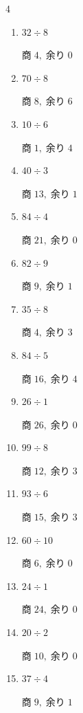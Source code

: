 \begin{multicols}{4}
\begin{enumerate}
\columnbreak %

  \item $32 \div 8$

        $商\; 4,\; 余り\; 0$

  \item $70 \div 8$

        $商\; 8,\; 余り\; 6$

  \item $10 \div 6$

        $商\; 1,\; 余り\; 4$

  \item $40 \div 3$

        $商\; 13,\; 余り\; 1$

  \item $84 \div 4$

        $商\; 21,\; 余り\; 0$

  \item $82 \div 9$

        $商\; 9,\; 余り\; 1$

  \item $35 \div 8$

        $商\; 4,\; 余り\; 3$

  \item $84 \div 5$

        $商\; 16,\; 余り\; 4$

  \item $26 \div 1$

        $商\; 26,\; 余り\; 0$

  \item $99 \div 8$

        $商\; 12,\; 余り\; 3$

  \item $93 \div 6$

        $商\; 15,\; 余り\; 3$

  \item $60 \div 10$

        $商\; 6,\; 余り\; 0$

  \item $24 \div 1$

        $商\; 24,\; 余り\; 0$

  \item $20 \div 2$

        $商\; 10,\; 余り\; 0$

  \item $37 \div 4$

        $商\; 9,\; 余り\; 1$


\end{enumerate}
\end{multicols}
